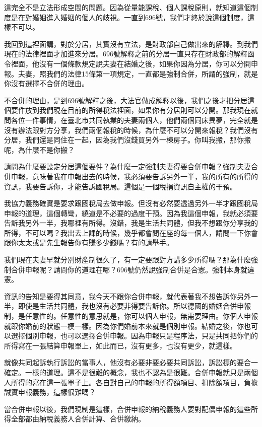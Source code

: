 \documentclass[]{ctexbook}
\begin{document}
這完全不是立法形成空間的問題。因為從量能課稅、個人課稅原則，就知道這個制度是在對婚姻進入婚姻的個人的歧視。一直到696號，我們才終於說這個制度，這樣不可以。

我回到這裡面講，對於分居，其實沒有立法，是財政部自己做出來的解釋。到我們現在的法律裡面才加進來分居。696號解釋之前的分居一直只存在財政部的解釋函令裡面，他沒有一個條款規定說夫妻在結婚之後，如果你因為分居，你可以分開申報。夫妻，照我們的法律15條第一項規定，一直都是強制合併，所謂的強制，就是你沒有選擇不合併的理由。

不合併的理由，是到696號解釋之後，大法官做成解釋以後，我們之後才把分居這個要件放到我們現在目前的所得稅法裡面，如果你有分居則可以分開。那我現在就問各位一件事情，在臺北市共同執業的夫妻兩個人，他們兩個同床異夢，完全就是沒有辦法跟對方分享，我們兩個報稅的時候，為什麼不可以分開來報稅？我們沒有分居，我們還是同住在一起，因為我們沒錢買另外一棟房子。你叫我搬，那你搬呢，為什麼不是你搬？

請問為什麼要設定分居這個要件？為什麼一定強制夫妻得要合併申報？強制夫妻合併申報，意味著我在申報出去的時候，我必須要告訴另外一半，我的所有的所得的資訊，我要告訴你，才能告訴國稅局。這個是一個稅捐資訊自主權的干預。

我協力義務確實是要求跟國稅局去做申報。但沒有必然要透過另外一半才跟國稅局申報的道理，這個轉彎，繞道是不必要的過度干預。因為我這個申報，我就必須要告訴我另外一半，我哪裡有所得。沒錯，我是生活共同體，但我不想跟你分享我的所得，不可以嗎？我出去上課的時候，幾乎都會問在座的每一個人，請問一下你會跟你太太或是先生報告你有賺多少錢嗎？有的請舉手。

我們現在夫妻早就分別財產制很久了，有一定要跟對方講多少所得嗎？那為什麼強制合併申報呢？請問你的道理在哪？696號仍然說強制合併是合憲。強制本身就違憲。

資訊的告知是要得其同意，我今天不跟你合併申報，就代表著我不想告訴你另外一半，即使是生活共同體，我也沒有必要非得要告訴你。所以德國的婚姻合併申報制，是任意性的。任意性的意思就是，你可以個人申報，無需要理由。你個人申報就跟你婚前的狀態一模一樣。因為你們婚前本來就是個別申報。結婚之後，你也可以選擇個別申報，也可以選擇合併申報。因為申報只是程序法，只是共同把你們的所得寫在一張結算申報單上，如此而已，沒有更多，也沒有更少，就這樣。

就像共同起訴執行訴訟的當事人，他沒有必要非要必要共同訴訟，訴訟標的要合一確定。一樣的道理。這不是很難的概念，我也不認為是很難。合併申報就只是兩個人所得的寫在這一張單子上。各自對自己的申報的所得額項目、扣除額項目，負擔誠實申報義務，這樣很難嗎？

當合併申報以後，我們現制是這樣，合併申報的納稅義務人要對配偶申報的這些所得全部都由納稅義務人合併計算、合併繳納。
\end{document}
